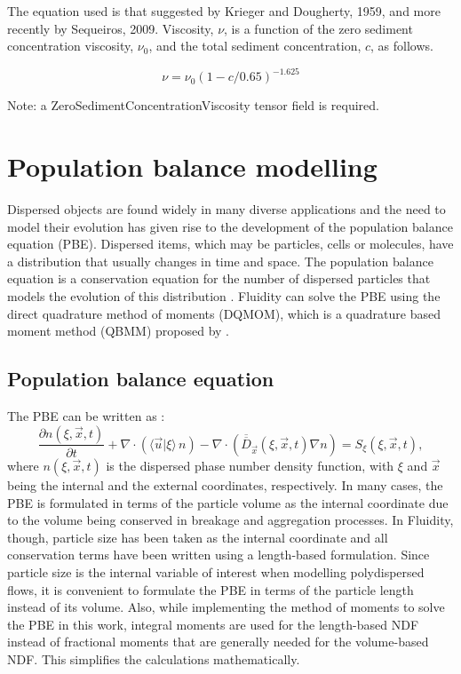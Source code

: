 The equation used is that suggested by Krieger and Dougherty, 1959, and more recently by
Sequeiros, 2009.  Viscosity, $\nu$, is a function of the zero sediment concentration
viscosity, $\nu_0$, and the total sediment concentration, $c$, as follows.

\begin{equation}\label{eq:sediment_concentration_dependent_viscosity}
  \nu = \nu_{0}(1-c/0.65)^{-1.625}
\end{equation}

Note: a ZeroSedimentConcentrationViscosity tensor field is required.

\newpage

\section{Population balance modelling}

Dispersed objects are found widely in many diverse applications and the need to model their evolution has given rise to the development of the population balance equation (PBE). Dispersed items, which may be particles, cells or molecules, have a distribution that usually changes in time and space. The population balance equation is a conservation equation for the number of dispersed particles that models the evolution of this distribution \citep{ramkrishna2000population}. Fluidity can solve the PBE using the direct quadrature method of moments (DQMOM), which is a quadrature based moment method (QBMM) proposed by \citet{marchisio2005solution}.

\subsection{Population balance equation}
The PBE can be written as \citep{ramkrishna2000population}:
\begin{equation}
\frac{\partial n(\xi,\vec{x},t)}{\partial t} + \nabla \cdot \left( \langle \vec{u}|\xi \rangle \, n \right) - \nabla \cdot \left( \overline{\overline D}_\vec{x} (\xi,\vec{x},t) \nabla n \right) = S_\xi (\xi,\vec{x},t),
\label{eq:pbe}
\end{equation}
where $n(\xi,\vec{x},t)$ is the dispersed phase number density function, with $\xi$ and $\vec{x}$  being the internal and the external coordinates, respectively. 
In many cases, the PBE is formulated in terms of the particle volume as the internal coordinate due to the volume being conserved in breakage and aggregation processes. 
In Fluidity, though, particle size has been taken as the internal coordinate and all conservation terms have been written using a length-based formulation. Since particle size is the internal variable of interest when modelling polydispersed flows, it is convenient to formulate the PBE in terms of the particle length instead of its volume. Also, while implementing the method of moments to solve the PBE in this work, integral moments are used for the length-based NDF instead of fractional moments that are generally needed for the volume-based NDF. This simplifies the calculations mathematically.

